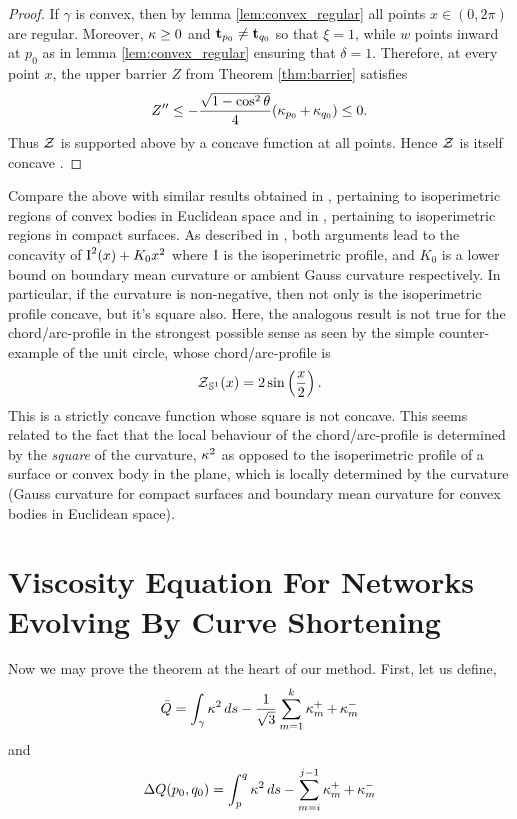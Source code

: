 \documentclass[11pt]{amsart}
\begin{document}
\begin{proof}
If $\gamma$ is convex, then by lemma \ref{lem:convex_regular} all points $x \in (0, 2\pi)$ are regular. Moreover, $\operatorname{\kappa} \geq 0$ and $\operatorname{\mathbf{t}}_{p_0} \ne \operatorname{\mathbf{t}}_{q_0}$ so that $\xi = 1$, while \(w\) points inward at $p_0$ as in lemma \ref{lem:convex_regular} ensuring that $\delta = 1$. Therefore, at every point $x$, the upper barrier $Z$ from Theorem \ref{thm:barrier} satisfies
\[
Z'' \leq - \frac{\sqrt{1-\cos^2 \theta}}{4} (\operatorname{\kappa}_{p_0} + \operatorname{\kappa}_{q_0}) \leq 0.
\]
Thus $\operatorname{\mathcal{Z}}$ is supported above by a concave function at all points. Hence $\operatorname{\mathcal{Z}}$ is itself concave \cite[Lemma 2.7]{MR1674097}.
\end{proof}

\begin{remark}
Compare the above with similar results obtained in \cite{MR1674097}, pertaining to isoperimetric regions of convex bodies in Euclidean space and in \cite{MR875084}, pertaining to isoperimetric regions in compact surfaces. As described in \cite{pbthesis}, both arguments lead to the concavity of $\operatorname{I}^2(x) + K_0 x^2$ where $\operatorname{I}$ is the isoperimetric profile, and $K_0$ is a lower bound on boundary mean curvature or ambient Gauss curvature respectively. In particular, if the curvature is non-negative, then not only is the isoperimetric profile concave, but it's square also. Here, the analogous result is not true for the chord/arc-profile in the strongest possible sense as seen by the simple counter-example of the unit circle, whose chord/arc-profile is
\[
\operatorname{\mathcal{Z}}_{\mathbb{S}^1} (x) = 2 \sin \left(\frac{x}{2}\right).
\]
This is a strictly concave function whose square is not concave. This seems related to the fact that the local behaviour of the chord/arc-profile is determined by the \emph{square} of the curvature, $\operatorname{\kappa}^2$ as opposed to the isoperimetric profile of a surface or convex body in the plane, which is locally determined by the curvature (Gauss curvature for compact surfaces and boundary mean curvature for convex bodies in Euclidean space).
\end{remark}

\section{Viscosity Equation For Networks Evolving By Curve Shortening}
\label{sec:viscosity_csf}

Now we may prove the theorem at the heart of our method. First, let us define,
\begin{equation}
\label{eq:Q}
\bar{Q} = \int_{\gamma} \operatorname{\kappa}^2 ds - \frac{1}{\sqrt{3}} \sum_{m=1}^{k} \operatorname{\kappa}_m^+ + \operatorname{\kappa}_m^-
\end{equation}
and
\begin{equation}
\label{eq:delQ}
\Delta Q(p_0, q_0) = \int_p^q \operatorname{\kappa}^2 ds - \sum_{m=i}^{j-1} \operatorname{\kappa}_m^+ + \operatorname{\kappa}_m^-
\end{equation}
\end{document}
